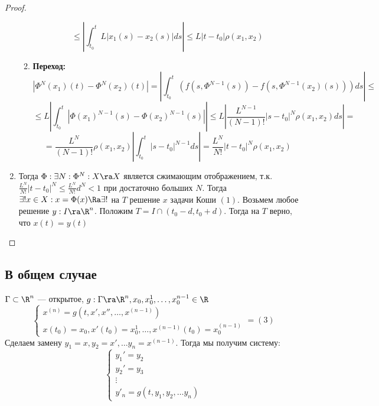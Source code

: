 \begin{proof}
\begin{enumerate}
\begin{enumerate}
            \[\le \left| \int_{t_0}^t L|x_1(s) - x_2(s)|ds \right| \le L|t - t_0|\rho(x_1, x_2)\]
            \item[] \textbf{Переход:}
            \[|\Phi^N(x_1)(t) - \Phi^N(x_2)(t)| = \left| \int_{t_0}^t \left( f(s, \Phi^{N - 1}(s)) - f(s, \Phi^{N - 1}(x_2)(s)) \right)ds \right| \le \]
            \[\le L\left| \int_{t_0}^t |\Phi(x_1)^{N - 1}(s) - \Phi(x_2)^{N - 1}(s)| \right| \le L\left| \frac{L^{N - 1}}{(N - 1)!}|s - t_0|^N\rho(x_1, x_2)ds \right| = \]
            \[= \frac{L^N}{(N - 1)!}\rho(x_1, x_2)\left| \int_{t_0}^t |s - t_0|^{N - 1}ds \right| = \frac{L^N}{N!}|t - t_0|^N\rho(x_1, x_2)\]
        \end{enumerate}

        \item Тогда \(\Phi: \exists N: \Phi^N: X \ra X\) является сжимающим отображением, т.к. \(\frac{L^N}{N!}|t - t_0|^N \le \frac{L^N}{N!}d^N < 1\) при достаточно больших \(N\). Тогда \(\exists! x \in X: x = \Phi(x) \Ra \exists!\) на \(T\) решение \(x\) задачи Коши \((1)\). Возьмем любое решение \(y: I \ra \R^n\). Положим \(T = I \cap (t_0 - d, t_0 + d)\). Тогда на \(T\) верно, что \(x(t) = y(t)\)
    \end{enumerate}
\end{proof}

\subsection{В общем случае}
\(\Gamma \subset \R^n\) --- открытое, \(g: \Gamma \ra \R^n, x_0, x_0^1, \dots, x_0^{n - 1} \in \R\)
\[\left\{\begin{array}{l}
    x^{(n)} = g(t, x', x'', \dots, x^{(n - 1)}) \\
    x(t_0) = x_0, x'(t_0) = x_0^1, \dots, x^{(n - 1)}(t_0) = x_0^{(n - 1)}
\end{array}\right. = (3)\]
Сделаем замену \(y_1 = x, y_2 = x', \dots y_n = x^{(n - 1)}\). Тогда мы получим систему:
\[\left\{\begin{array}{l}
    y_1' = y_2 \\
    y_2' = y_3 \\
    \vdots \\
    y'_n = g(t, y_1, y_2, \dots y_n)
\end{array}\right.\]

